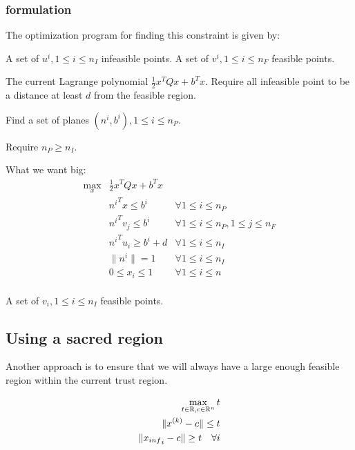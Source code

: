 \subsubsection{formulation}

The optimization program for finding this constraint is given by:

A set of $u^i, 1 \le i \le n_{I}$ infeasible points.
A set of $v^i, 1 \le i \le n_{F}$ feasible points.

The current Lagrange polynomial $\frac 1 2 x^T Q x + b^Tx$.
Require all infeasible point to be a distance at least $d$ from the feasible region.


Find a set of planes $(n^i, b^i), 1 \le i \le n_{P}$.

Require $n_P \ge n_I$.


What we want big:
\begin{align}
\max_{x} & \frac 1 2 x^T Q x + b^Tx &\\
 & {n^i}^T x \le b^i & \forall 1 \le i \le n_{P} \\
 & {n^i}^T v_j \le b^i & \forall 1 \le i \le n_{P}, 1\le j\le  n_{F} \\
 & {n^i}^T u_i \ge b^i + d & \forall 1 \le i \le n_{I} \\
 & \| n^i \| = 1 & \forall 1 \le i \le n_{I} \\
 & 0 \le x_i \le 1 & \forall 1 \le i \le n \\
\end{align}


A set of $v_i, 1 \le i \le n_{I}$ feasible points.




\subsection{Using a sacred region}

Another approach is to ensure that we will always have a large enough feasible region within the current trust region.

\begin{align*}
\max_{t \in \mathbb R, c \in \mathbb R^n} t \\
\| {x^{(k)}} - c\| \le t \\
\| {x_{inf}}_i - c \| \ge t \quad \forall i
\end{align*}

